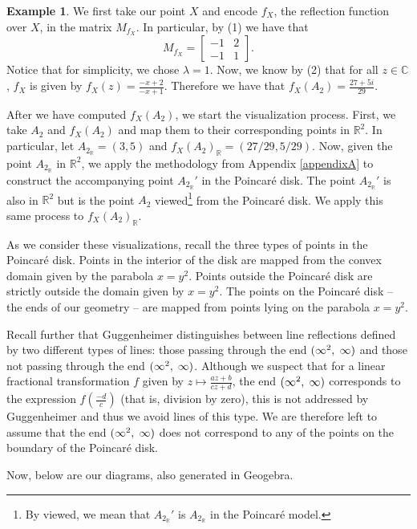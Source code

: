 \documentclass[12pt]{article}
\newcommand{\R}{\mathbb{R}}
\newcommand{\C}{\mathbb{C}}
\newcommand{\lftmat}[4]{\begin{bmatrix} {#1} & {#2} \\ {#3} & {#4} \end{bmatrix}}
\newcommand{\ttc}{, \hspace{1mm}}
\newcommand{\poincare}{Poincar\'{e} }
\newcommand{\specialend}{(\infty^2\ttc\infty)}
\theoremstyle{plain}
\theoremstyle{definition}
\newtheorem{example}[theorem]{Example}
\begin{document}
\begin{example}
We first take our point $X$ and encode $f_X$, the reflection function over $X$, in the matrix $M_{f_X}$. In particular, by (1) we have that 
\[M_{f_X} = \lftmat{-1}{2}{-1}{1}.\]
Notice that for simplicity, we chose $\lambda = 1$. Now, we know by (2) that for all $z \in \C$, $f_X$ is given by $f_X(z) = \frac{-x+2}{-x+1}$. Therefore we have that $f_X(A_2) = \frac{27+5i}{29}$. 

After we have computed $f_X(A_2)$, we start the visualization process. First, we take $A_2$ and $f_X(A_2)$ and map them to their corresponding points in $\R^2$. In particular, let $A_{2_\R} = (3,5)$ and $f_X(A_2)_\R = (27/29, 5/29)$. Now, given the point $A_{2_\R}$ in $\R^2$, we apply the methodology from Appendix \ref{appendixA} to construct the accompanying point $A_{2_\R}'$ in the \poincare disk. The point $A_{2_\R}'$ is also in $\R^2$ but is the point $A_2$ viewed\footnote{By viewed, we mean that $A_{2_\R}'$ is $A_{2_\R}$ in the \poincare model.} from the \poincare disk. We apply this same process to $f_X(A_2)_\R$.
\end{example}

As we consider these visualizations, recall the three types of points in the \poincare disk. Points in the interior of the disk are mapped from the convex domain given by the parabola $x = y^2$. Points outside the \poincare disk are strictly outside the domain given by $x = y^2$. The points on the \poincare disk -- the ends of our geometry -- are mapped from points lying on the parabola $x=y^2$.

Recall further that Guggenheimer distinguishes between line reflections defined by two different types of lines: those passing through the end $\specialend$ and those not passing through the end $\specialend$. Although we suspect that for a linear fractional transformation $f$ given by $z \mapsto \frac{az+b}{cz+d}$, the end $\specialend$ corresponds to the expression $f(\frac{-d}{c})$ (that is, division by zero), this is not addressed by Guggenheimer and thus we avoid lines of this type. We are therefore left to assume that the end $\specialend$ does not correspond to any of the points on the boundary of the \poincare disk. 

Now, below are our diagrams, also generated in Geogebra.
\end{document}
